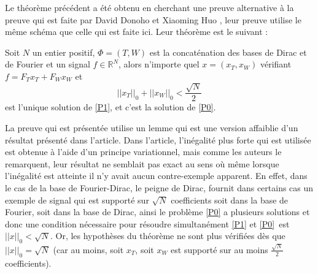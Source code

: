 \begin{remarque}
	Le théorème précédent a été obtenu en cherchant une preuve alternative à la preuve qui est faite par David Donoho et Xiaoming Huo \cite{DonohoHuo}, leur preuve utilise le même schéma que celle qui est faite ici.
	Leur théorème est le suivant :
\begin{theoreme}\label{th:donohohuo}
	Soit $N$ un entier positif, $\Phi = (T, W)$ est la concaténation des bases de Dirac et de Fourier et un signal $f\in \mathbb{R}^N$, alors n'importe quel $x = (x_T, x_W)$ vérifiant $f = F_T x_T + F_W x_W$ et
	\begin{equation}
		||x_T||_0 +  ||x_W||_0 < \frac{\sqrt{N}}{2}
	\end{equation}
	est l'unique solution de \ref{P1}, et c'est la solution de \ref{P0}.
\end{theoreme}
	La preuve qui est présentée utilise un lemme qui est une version affaiblie d'un résultat présenté dans l'article.
	Dans l'article, l'inégalité plus forte qui est utilisée est obtenue à l'aide d'un principe variationnel, mais comme les auteurs le remarquent, leur résultat ne semblait pas exact au sens où même lorsque l'inégalité est atteinte il n'y avait aucun contre-exemple apparent.
	En effet, dans le cas de la base de Fourier-Dirac, le peigne de Dirac, fournit dans certains cas un exemple de signal qui est supporté sur $\sqrt{N}$ coefficients soit dans la base de Fourier, soit dans la base de Dirac, ainsi le problème \ref{P0} a plusieurs solutions et donc une condition nécessaire pour résoudre simultanément \ref{P1} et \ref{P0} est $||x||_0 < \sqrt{N}$.
	Or, les hypothèses du théorème ne sont plus vérifiées dès que $||x||_0 = \sqrt{N}$ (car au moins, soit $x_T$, soit $x_W$ est supporté sur au moins $\frac{\sqrt{N}}{2}$ coefficients). 
\end{remarque}
